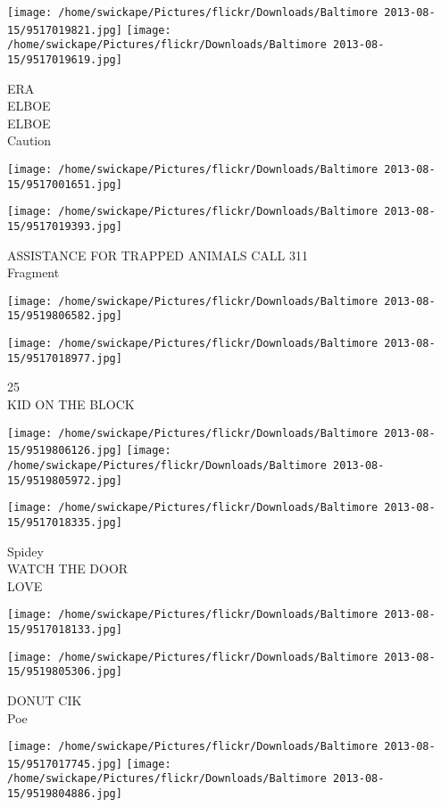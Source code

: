 \documentclass[10pt,letterpaper]{article}
\begin{document}
\texttt{[image: /home/swickape/Pictures/flickr/Downloads/Baltimore 2013-08-15/9517019821.jpg]}
\texttt{[image: /home/swickape/Pictures/flickr/Downloads/Baltimore 2013-08-15/9517019619.jpg]}

ERA\\
ELBOE\\
ELBOE\\
Caution
\pagebreak

\texttt{[image: /home/swickape/Pictures/flickr/Downloads/Baltimore 2013-08-15/9517001651.jpg]}

\vspace{0.25in}
\texttt{[image: /home/swickape/Pictures/flickr/Downloads/Baltimore 2013-08-15/9517019393.jpg]}

ASSISTANCE FOR TRAPPED ANIMALS CALL 311\\
Fragment
\pagebreak

\texttt{[image: /home/swickape/Pictures/flickr/Downloads/Baltimore 2013-08-15/9519806582.jpg]}

\vspace{0.25in}
\texttt{[image: /home/swickape/Pictures/flickr/Downloads/Baltimore 2013-08-15/9517018977.jpg]}

25\\
KID ON THE BLOCK
\pagebreak

\texttt{[image: /home/swickape/Pictures/flickr/Downloads/Baltimore 2013-08-15/9519806126.jpg]}
\texttt{[image: /home/swickape/Pictures/flickr/Downloads/Baltimore 2013-08-15/9519805972.jpg]}

\vspace{0.25in}
\texttt{[image: /home/swickape/Pictures/flickr/Downloads/Baltimore 2013-08-15/9517018335.jpg]}

Spidey\\
WATCH THE DOOR\\
LOVE
\pagebreak

\texttt{[image: /home/swickape/Pictures/flickr/Downloads/Baltimore 2013-08-15/9517018133.jpg]}

\vspace{0.25in}
\texttt{[image: /home/swickape/Pictures/flickr/Downloads/Baltimore 2013-08-15/9519805306.jpg]}

DONUT CIK\\
Poe
\pagebreak

\texttt{[image: /home/swickape/Pictures/flickr/Downloads/Baltimore 2013-08-15/9517017745.jpg]}
\texttt{[image: /home/swickape/Pictures/flickr/Downloads/Baltimore 2013-08-15/9519804886.jpg]}
\end{document}
